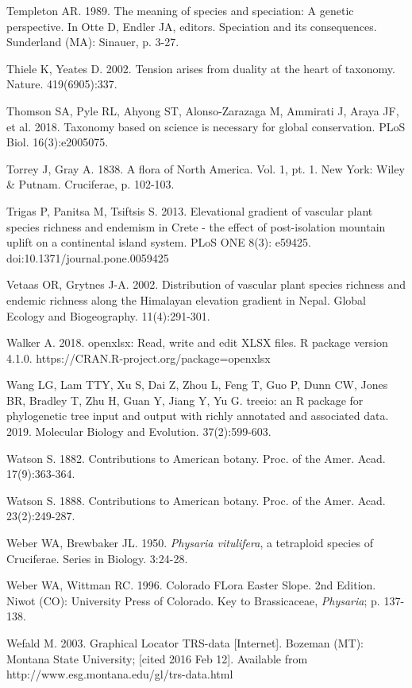 Templeton AR. 1989. The meaning of species and speciation: A genetic perspective. In Otte D, Endler JA, editors. Speciation and its consequences. Sunderland (MA): Sinauer, p. 3-27.

Thiele K, Yeates D. 2002. Tension arises from duality at the heart of taxonomy. Nature. 419(6905):337.

Thomson SA, Pyle RL, Ahyong ST, Alonso-Zarazaga M, Ammirati J, Araya JF, et al. 2018. Taxonomy based on science is necessary for global conservation. PLoS Biol. 16(3):e2005075.

Torrey J, Gray A. 1838. A flora of North America. Vol. 1, pt. 1. New York: Wiley \& Putnam. Cruciferae, p. 102-103.

Trigas P, Panitsa M, Tsiftsis S. 2013. Elevational gradient of vascular plant species richness and endemism in Crete - the effect of post-isolation mountain uplift on a continental island system. PLoS ONE 8(3): e59425. doi:10.1371/journal.pone.0059425

Vetaas OR, Grytnes J-A. 2002. Distribution of vascular plant species richness and endemic richness along the Himalayan elevation gradient in Nepal. Global Ecology and Biogeography. 11(4):291-301.

Walker A. 2018. openxlsx: Read, write and edit XLSX files. R package version 4.1.0. https://CRAN.R-project.org/package=openxlsx

Wang LG, Lam TTY, Xu S, Dai Z, Zhou L, Feng T, Guo P, Dunn CW, Jones BR, Bradley T, Zhu H, Guan Y, Jiang Y, Yu G. treeio: an R package for phylogenetic tree input and output with richly annotated and associated data. 2019. Molecular Biology and Evolution. 37(2):599-603.

Watson S. 1882. Contributions to American botany. Proc. of the Amer. Acad. 17(9):363-364.

Watson S. 1888. Contributions to American botany. Proc. of the Amer. Acad. 23(2):249-287.

Weber WA, Brewbaker JL. 1950. \textit{Physaria vitulifera}, a tetraploid species of Cruciferae. Series in Biology. 3:24-28.

Weber WA, Wittman RC. 1996. Colorado FLora Easter Slope. 2nd Edition. Niwot (CO): University Press of Colorado. Key to Brassicaceae, \textit{Physaria}; p. 137-138.

Wefald M. 2003. Graphical Locator TRS-data [Internet]. Bozeman (MT): Montana State University; [cited 2016 Feb 12]. Available from http://www.esg.montana.edu/gl/trs-data.html

